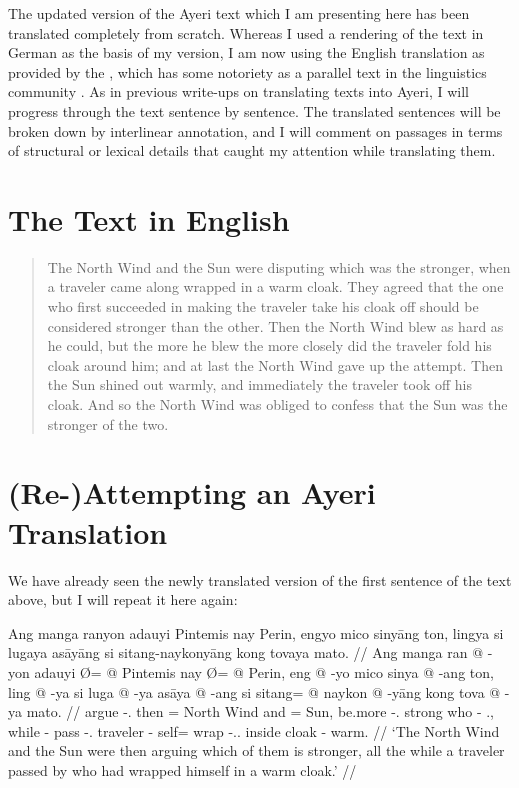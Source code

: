 \documentclass[12pt,paper=a4]{scrartcl}
\begin{document}
The updated version of the Ayeri text which I am presenting here has been translated completely from scratch. Whereas I used a rendering of the text in German as the basis of my \citeyear{becker2004} version, I am now using the English translation as provided by the , which has some notoriety as a parallel text in the linguistics community \autocite[see e.g.][97]{cysouwwälchli2007}. As in previous write-ups on translating texts into Ayeri, I will progress through the text sentence by sentence. The translated sentences will be broken down by interlinear annotation, and I will comment on passages in terms of structural or lexical details that caught my attention while translating them.

\section{The Text in English}

\blockcquote[???]{ipa2007}{The North Wind and the Sun were disputing which was the stronger, when a traveler came along wrapped in a warm cloak. They agreed that the one who first succeeded in making the traveler take his cloak off should be considered stronger than the other. Then the North Wind blew as hard as he could, but the more he blew the more closely did the traveler fold his cloak around him; and at last the North Wind gave up the attempt. Then the Sun shined out warmly, and immediately the traveler took off his cloak. And so the North Wind was obliged to confess that the Sun was the stronger of the two.}

\section{(Re-)Attempting an Ayeri Translation}

We have already seen the newly translated version of the first sentence of the text above, but I will repeat it here again:

\ex %
\begingl
	\glpreamble Ang manga ranyon adauyi Pintemis nay Perin, engyo mico sinyāng ton, lingya si lugaya asāyāng si sitang-naykonyāng kong tovaya mato. //
	\gla Ang manga ran @ -yon adauyi Ø= @ Pintemis nay Ø= @ Perin, eng @ -yo mico sinya @ -ang ton, ling @ -ya si luga @ -ya asāya @ -ang si sitang= @ naykon @ -yāng kong tova @ -ya mato. //
	\glb \AgtT{} \Prog{} argue -\Tpl{}.\N{} then \Top{}= {North Wind} and \Top{}= Sun, be.more -\Tsg{}.\N{} strong who -\Aarg{} \Tpl{}.\Gen{}, while -\Loc{} \Rel{} pass -\Tsg{}.\M{} traveler -\Aarg{} \Rel{} self= wrap -\Tsg{}.\M{}.\Aarg{} inside cloak -\Loc{} warm. //
	\glft `The North Wind and the Sun were then arguing which of them is stronger, all the while a traveler passed by who had wrapped himself in a warm cloak.' //
\endgl
\xe
\end{document}
